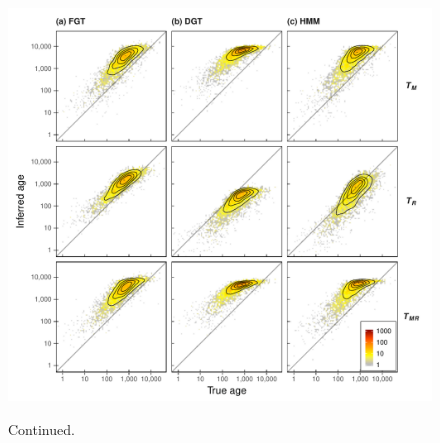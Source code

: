 \begin{figure}[!tbp]
\ContinuedFloat
	{\footnotesize\quad{}} \\
	\includegraphics[width=\textwidth]{./img/ch5/vanilla_soft_breaks}
	\small
	\caption[]{Continued.}
	\label{fig:vanilla_plots:B}
\end{figure}

